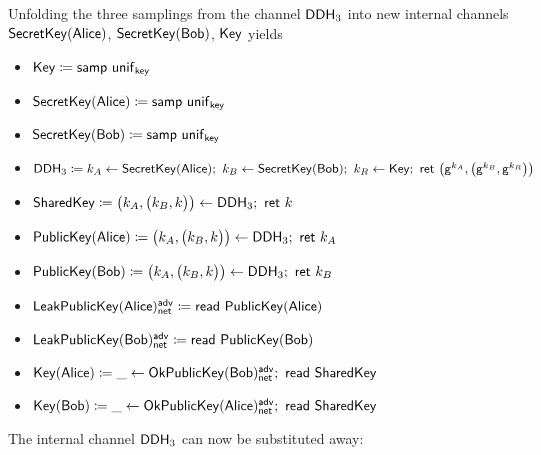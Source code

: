 \noindent Unfolding the three samplings from the channel $\mathsf{DDH}_3$ into new internal channels $\mathsf{SecretKey}(\mathsf{Alice})$, $\mathsf{SecretKey}(\mathsf{Bob})$, $\mathsf{Key}$ yields

\begin{itemize}
\item {\color{red} $\mathsf{Key} \coloneqq \mathsf{samp} \ \mathsf{unif}_{\mathsf{key}}$}
\item {\color{red} $\mathsf{SecretKey}(\mathsf{Alice}) \coloneqq \mathsf{samp} \ \mathsf{unif}_{\mathsf{key}}$}
\item {\color{red} $\mathsf{SecretKey}(\mathsf{Bob}) \coloneqq \mathsf{samp} \ \mathsf{unif}_{\mathsf{key}}$}
\item {\color{red} $\mathsf{DDH}_3 \coloneqq k_A \leftarrow \mathsf{SecretKey}(\mathsf{Alice}); \ k_B \leftarrow \mathsf{SecretKey}(\mathsf{Bob}); \ k_R \leftarrow \mathsf{Key}; \ \mathsf{ret} \ \big(\mathsf{g}^{k_A}, \big(\mathsf{g}^{k_B}, \mathsf{g}^{k_R}\big)\big)$}
\item $\SharedKey \coloneqq \big(k_A,\big(k_B,k\big)\big) \leftarrow \DDH_3; \ \ret{k}$
\item $\PublicKey(\Alice) \coloneqq \big(k_A,\big(k_B,k\big)\big) \leftarrow \DDH_3; \ \ret{k_A}$
\item $\PublicKey(\Bob) \coloneqq \big(k_A,\big(k_B,k\big)\big) \leftarrow \DDH_3; \ \ret{k_B}$
\item $\mathsf{LeakPublicKey}(\mathsf{Alice})^{\mathsf{adv}}_{\mathsf{net}} \coloneqq \mathsf{read} \ \mathsf{PublicKey}(\mathsf{Alice})$
\item $\mathsf{LeakPublicKey}(\mathsf{Bob})^{\mathsf{adv}}_{\mathsf{net}} \coloneqq \mathsf{read} \ \mathsf{PublicKey}(\mathsf{Bob})$
\item $\mathsf{Key}(\mathsf{Alice}) \coloneqq \_ \leftarrow \mathsf{OkPublicKey}(\mathsf{Bob})^{\mathsf{adv}}_{\mathsf{net}}; \ \mathsf{read} \ \mathsf{SharedKey}$
\item $\mathsf{Key}(\mathsf{Bob}) \coloneqq \_ \leftarrow \mathsf{OkPublicKey}(\mathsf{Alice})^{\mathsf{adv}}_{\mathsf{net}}; \ \mathsf{read} \ \mathsf{SharedKey}$
\end{itemize}

\noindent The internal channel $\mathsf{DDH}_3$ can now be substituted away:

